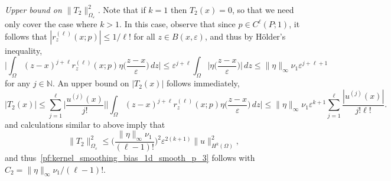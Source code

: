 \documentclass{article}
\newcommand{\1}{\mathbf{1}}
\theoremstyle{definition}
\theoremstyle{remark}
\begin{document}
\textit{Upper bound on $\|T_2\|_{\Omega_{\varepsilon}}^2$.}
Note that if $k = 1$ then $T_2(x) = 0$, so that we need only cover the case where $k > 1$. In this case, observe that since $p \in C^{\ell}(P;1)$, it follows that $|r_z^{(\ell)}(x;p)| \leq 1/\ell!$ for all $z \in B(x,\varepsilon)$, and thus by H\"{o}lder's inequality,
\begin{equation*}
\biggl|\int_{\Omega} (z - x)^{j + \ell} r_z^{(\ell)}(x;p) \eta\biggl(\frac{z - x}{\varepsilon}\biggr) \,dz\biggr| \leq \varepsilon^{j + \ell}\int_{\Omega} \biggl| \eta\biggl(\frac{z - x}{\varepsilon}\biggr) \biggr| \,dz \leq \|\eta\|_{\infty} \nu_1 \varepsilon^{j + \ell + 1} 
\end{equation*}
for any $j \in \mathbb{N}$. An upper bound on $|T_2(x)|$ follows immediately,
\begin{equation*}
|T_2(x)| \leq \sum_{j = 1}^{\ell} \biggl|\frac{u^{(j)}(x)}{j!}\biggr| \biggl|\int_{\Omega} (z - x)^{j + \ell} r_z^{(\ell)}(x;p) \eta\biggl(\frac{z - x}{\varepsilon}\biggr) \,dz\biggr| \leq \|\eta\|_{\infty} \nu_1 \varepsilon^{k + 1} \sum_{j = 1}^{\ell} \frac{|u^{(j)}(x)|}{j!\ell!}.
\end{equation*}
and calculations similar to above imply that
\begin{equation*}
\|T_2\|_{\Omega_{\varepsilon}}^2 \leq \biggl(\frac{\|\eta\|_{\infty} \nu_1}{(\ell - 1)!}\biggr)^2 \varepsilon^{2(k + 1)} \|u\|_{H^k(\Omega)}^2,
\end{equation*}
and thus~\eqref{pf:kernel_smoothing_bias_1d_smooth_p_3} follows with $C_2 = \|\eta\|_{\infty} \nu_1/(\ell - 1)!$. 
\end{document}
